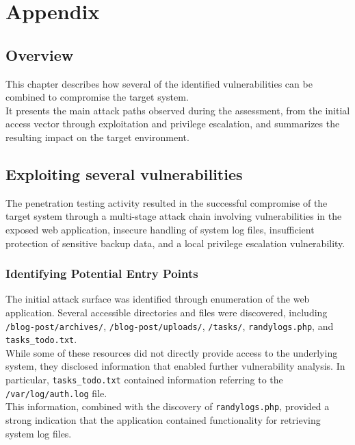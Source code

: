 \chapter{Appendix}

\section{Overview}

This chapter describes how several of the identified vulnerabilities can be combined to compromise the target system. 
\\

It presents the main attack paths observed during the assessment, from the initial access vector through exploitation and privilege escalation, and summarizes the resulting impact on the target environment. 

\section{Exploiting several vulnerabilities}

The penetration testing activity resulted in the successful compromise of the target system through a multi-stage attack chain involving vulnerabilities in the exposed web application, insecure handling of system log files, insufficient protection of sensitive backup data, and a local privilege escalation vulnerability.

\subsection{Identifying Potential Entry Points}
The initial attack surface was identified through enumeration of the web application. Several accessible directories and files were discovered, including \texttt{/blog-post/archives/}, \texttt{/blog-post/uploads/}, \texttt{/tasks/}, \texttt{randylogs.php}, and \texttt{tasks\_todo.txt}.
\\

While some of these resources did not directly provide access to the underlying system, they disclosed information that enabled further vulnerability analysis. In particular, \texttt{tasks\_todo.txt} contained information referring to the \texttt{/var/log/auth.log} file. 
\\

This information, combined with the discovery of \texttt{randylogs.php}, provided a strong indication that the application contained functionality for retrieving system log files.

